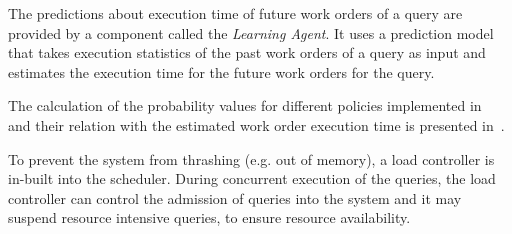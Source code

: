 The predictions about execution time of future work orders of a query are provided by a component called the \textit{Learning Agent}.
It uses a prediction model that takes execution statistics of the past work orders of a query as input and estimates the execution time for the future work orders for the query.

The calculation of the probability values for different policies implemented in \Quickstep\, and their relation with the estimated work order execution time is presented in~\cite{scheduler}.

To prevent the system from thrashing (e.g. out of memory), a load controller is in-built into the scheduler.
During concurrent execution of the queries, the load controller can control the admission of queries into the system and it may suspend resource intensive queries, to ensure resource availability.

